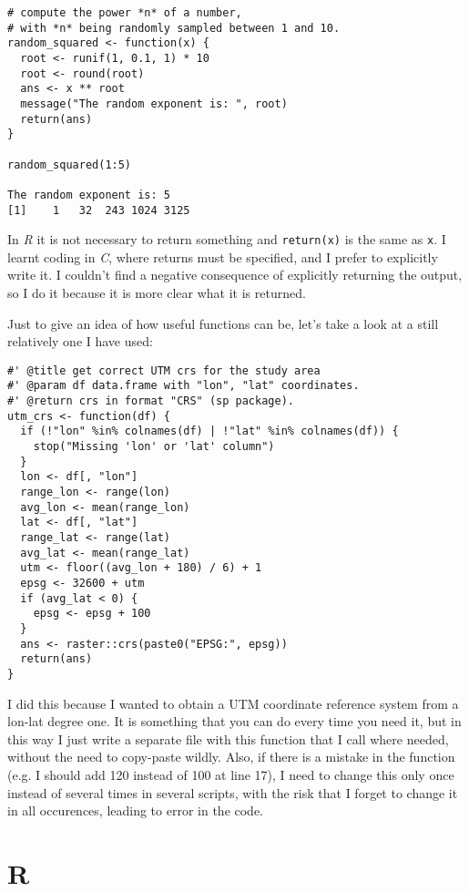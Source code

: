 \documentclass{book}
\begin{document}
\begin{lstlisting}[showstringspaces=false]
# compute the power *n* of a number,
# with *n* being randomly sampled between 1 and 10.
random_squared <- function(x) {
  root <- runif(1, 0.1, 1) * 10
  root <- round(root)
  ans <- x ** root
  message("The random exponent is: ", root)
  return(ans)
}

random_squared(1:5)

The random exponent is: 5
[1]    1   32  243 1024 3125
\end{lstlisting}

In \textit{R} it is not necessary to return something and \texttt{return(x)} is the same as \texttt{x}. I learnt coding in \textit{C}, where returns must be specified, and I prefer to explicitly write it. I couldn't find a negative consequence of explicitly returning the output, so I do it because it is more clear what it is returned.

Just to give an idea of how useful functions can be, let's take a look at a still relatively one I have used:

\begin{lstlisting}[showstringspaces=false]
#' @title get correct UTM crs for the study area
#' @param df data.frame with "lon", "lat" coordinates.
#' @return crs in format "CRS" (sp package).
utm_crs <- function(df) {
  if (!"lon" %in% colnames(df) | !"lat" %in% colnames(df)) {
    stop("Missing 'lon' or 'lat' column")
  }
  lon <- df[, "lon"]
  range_lon <- range(lon)
  avg_lon <- mean(range_lon)
  lat <- df[, "lat"]
  range_lat <- range(lat)
  avg_lat <- mean(range_lat)
  utm <- floor((avg_lon + 180) / 6) + 1
  epsg <- 32600 + utm
  if (avg_lat < 0) {
    epsg <- epsg + 100
  }
  ans <- raster::crs(paste0("EPSG:", epsg))
  return(ans)
}

\end{lstlisting}

I did this because I wanted to obtain a UTM coordinate reference system from a lon-lat degree one. It is something that you can do every time you need it, but in this way I just write a separate file with this function that I call where needed, without the need to copy-paste wildly. Also, if there is a mistake in the function (e.g. I should add 120 instead of 100 at line 17), I need to change this only once instead of several times in several scripts, with the risk that I forget to change it in all occurences, leading to error in the code.

\chapter{R}
\end{document}
